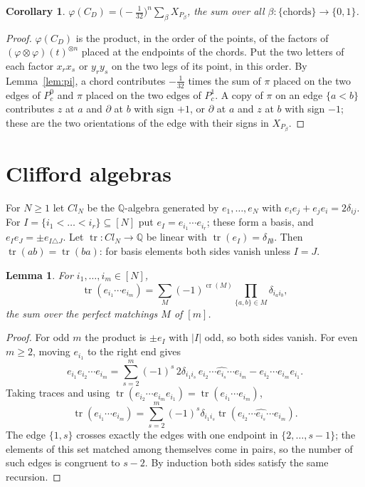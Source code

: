 \documentclass[preprint,12pt]{elsarticle}
\newtheorem{lemma}[theorem]{Lemma}
\newtheorem{corollary}[theorem]{Corollary}
\theoremstyle{definition}
\newcommand{\Q}{\mathbb{Q}}
\newcommand{\tr}{\operatorname{tr}}
\newcommand{\cro}{\operatorname{cr}}
\newcommand{\dd}{\partial}
\begin{document}
\begin{corollary}\label{cor:legs}
$\varphi(C_D)=\bigl(-\frac{1}{32}\bigr)^n\sum_\beta X_{P_\beta}$, the sum over all $\beta\colon\{\text{chords}\}\to\{0,1\}$.
\end{corollary}

\begin{proof}
$\varphi(C_D)$ is the product, in the order of the points, of the factors of $(\varphi\otimes\varphi)(t)^{\otimes n}$ placed at the endpoints of the chords. Put the two letters of each factor $x_rx_s$ or $y_ry_s$ on the two legs of its point, in this order. By Lemma~\ref{lem:pi}, a chord contributes $-\frac1{32}$ times the sum of $\pi$ placed on the two edges of $P_c^0$ and $\pi$ placed on the two edges of $P_c^1$. A copy of $\pi$ on an edge $\{a<b\}$ contributes $z$ at $a$ and $\dd$ at $b$ with sign $+1$, or $\dd$ at $a$ and $z$ at $b$ with sign $-1$; these are the two orientations of the edge with their signs in $X_{P_\beta}$.
\end{proof}

\section{Clifford algebras}\label{sec:clifford}

For $N\ge1$ let $Cl_N$ be the $\Q$-algebra generated by $e_1,\dots,e_N$ with $e_ie_j+e_je_i=2\delta_{ij}$. For $I=\{i_1<\dots<i_r\}\subseteq[N]$ put $e_I=e_{i_1}\cdots e_{i_r}$; these form a basis, and $e_Ie_J=\pm e_{I\triangle J}$. Let $\tr\colon Cl_N\to\Q$ be linear with $\tr(e_I)=\delta_{I\emptyset}$. Then $\tr(ab)=\tr(ba)$: for basis elements both sides vanish unless $I=J$.

\begin{lemma}\label{lem:cliffwick}
For $i_1,\dots,i_m\in[N]$,
\[
\tr(e_{i_1}\cdots e_{i_m})=\sum_M(-1)^{\cro(M)}\prod_{\{a,b\}\in M}\delta_{i_ai_b},
\]
the sum over the perfect matchings $M$ of $[m]$.
\end{lemma}

\begin{proof}
For odd $m$ the product is $\pm e_I$ with $|I|$ odd, so both sides vanish. For even $m\ge2$, moving $e_{i_1}$ to the right end gives
\[
e_{i_1}e_{i_2}\cdots e_{i_m}=\sum_{s=2}^m(-1)^{s}\,2\delta_{i_1i_s}\,e_{i_2}\cdots\widehat{e_{i_s}}\cdots e_{i_m}-e_{i_2}\cdots e_{i_m}e_{i_1}.
\]
Taking traces and using $\tr(e_{i_2}\cdots e_{i_m}e_{i_1})=\tr(e_{i_1}\cdots e_{i_m})$,
\[
\tr(e_{i_1}\cdots e_{i_m})=\sum_{s=2}^m(-1)^s\delta_{i_1i_s}\tr(e_{i_2}\cdots\widehat{e_{i_s}}\cdots e_{i_m}).
\]
The edge $\{1,s\}$ crosses exactly the edges with one endpoint in $\{2,\dots,s-1\}$; the elements of this set matched among themselves come in pairs, so the number of such edges is congruent to $s-2$. By induction both sides satisfy the same recursion.
\end{proof}
\end{document}
